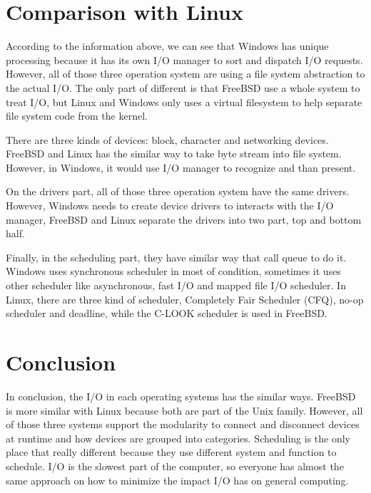 \documentclass[onecolumn, draftclsnofoot,10pt, compsoc]{IEEEtran}
\begin{document}
\section{Comparison with Linux}
According to the information above, we can see that Windows has unique processing because it has its own I/O manager to sort and dispatch I/O requests. However, all of those three operation system are using a file system abstraction to the actual I/O. The  only part of different is that FreeBSD use a whole system to treat I/O, but Linux and Windows only uses a virtual filesystem to help separate file system code from the kernel.

There are three kinds of devices: block, character and networking devices. FreeBSD and Linux has the similar way to take byte stream into file system. However, in Windows, it would use I/O manager to recognize and than present.

On the drivers part, all of those three operation system have the same drivers. However, Windows needs to create device drivers to interacts with the I/O manager, FreeBSD and Linux separate the drivers into two part, top and bottom half.

Finally, in the scheduling part, they have similar way that call queue to do it. Windows uses synchronous scheduler in most of condition, sometimes it uses other scheduler like asynchronous, fast I/O and mapped file I/O scheduler. In Linux, there are three kind of scheduler, Completely Fair Scheduler (CFQ), no-op scheduler and deadline, while the C-LOOK scheduler is used in FreeBSD.

\section{Conclusion}
In conclusion, the I/O in each operating systems has the similar ways. FreeBSD is more similar with Linux because both are part of the Unix family. However, all of those three systems support the modularity to connect and disconnect devices at runtime and how devices are grouped into categories. Scheduling is the only place that really different because they use different system and function to schedule. I/O is the slowest part of the computer, so everyone has almost the same approach on how to minimize the impact I/O has on general computing.
\newpage
\end{document}
